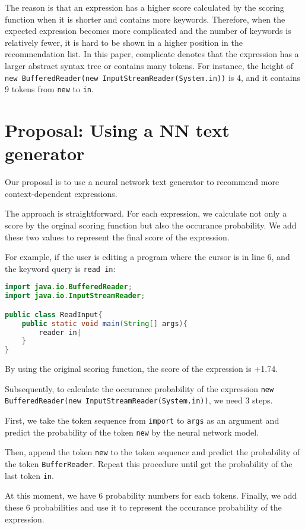 \documentclass[PRO,english]{ipsj}
\begin{document}
The reason is that an expression has a higher score calculated by the scoring function when it is shorter and contains more keywords. Therefore, when the expected expression becomes more complicated and the number of keywords is relatively fewer, it is hard to be shown in a higher position in the recommendation list. In this paper, complicate denotes that the expression has a larger abstract syntax tree or contains many tokens. For instance, the height of \texttt{new BufferedReader(new InputStreamReader(System.in))} is 4, and it contains 9 tokens from \texttt{new} to \texttt{in}.

\section{Proposal: Using a NN text generator}\label{sec:proposal}
Our proposal is to use a neural network text generator to recommend more context-dependent expressions.

The approach is straightforward. For each expression, we calculate not only a score by the orginal scoring function but also the occurance probability. We add these two values to represent the final score of the expression.

For example, if the user is editing a program where the cursor is in line 6, and the keyword query is \texttt{read in}:
\begin{lstlisting}[language=Java]
import java.io.BufferedReader;
import java.io.InputStreamReader;

public class ReadInput{
    public static void main(String[] args){
        reader in|
    }
}
\end{lstlisting}

By using the original scoring function, the score of the expression is +1.74. 

Subsequently, to calculate the occurance probability of the expression \texttt{new BufferedReader(new InputStreamReader(System.in))}, we need 3 steps. 

First, we take the token sequence from \texttt{import} to \texttt{args} as an argument and predict the probability of the token \texttt{new} by the neural network model. 

Then, append the token \texttt{new} to the token sequence and predict the probability of the token \texttt{BufferReader}. Repeat this procedure until get the probability of the last token \texttt{in}. 

At this moment, we have 6 probability numbers for each tokens.  Finally, we add these 6 probabilities and use it to represent the occurance probability of the expression.
\end{document}

